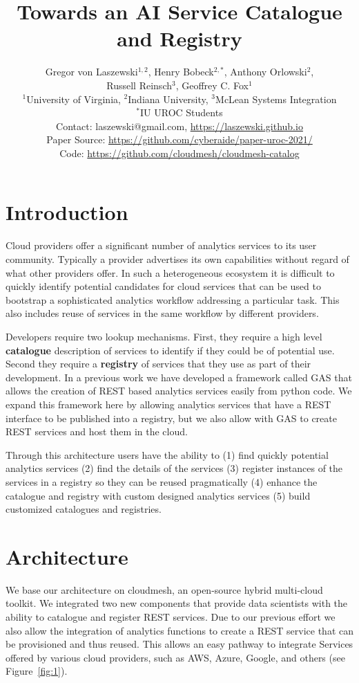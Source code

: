 \documentclass[12pt]{article}
\date{}
\title{Towards an AI Service Catalogue and Registry}
\author{Gregor von Laszewski$^{1,2}$,
Henry Bobeck$^{2,*}$,
Anthony Orlowski$^2$,\\
Russell Reinsch$^3$,
Geoffrey C. Fox$^1$\\
\footnotesize $^1$University of Virginia, 
$^2$Indiana University,
\footnotesize $^3$McLean Systems Integration\\
\footnotesize $^*$IU UROC Students \\
{
\footnotesize Contact: laszewski@gmail.com, \url{https://laszewski.github.io}\\
\footnotesize Paper Source: \url{https://github.com/cyberaide/paper-uroc-2021/}\\
\footnotesize Code: \url{https://github.com/cloudmesh/cloudmesh-catalog}}
}
\begin{document}
\maketitle

\section{Introduction}

Cloud providers offer a significant number of analytics services to its user community. Typically a provider advertises its own capabilities without regard of what other providers offer. In such a heterogeneous ecosystem it is difficult to quickly identify potential candidates for cloud services that can be used to bootstrap a sophisticated analytics workflow addressing a particular task. This also includes reuse of services in the same workflow by different providers. 

Developers require two lookup mechanisms. First, they require a high level {\bf catalogue} description of services to identify if they could be of potential use. Second they require a {\bf registry} of services that they use as part of their development. In a previous work we have developed a framework called GAS \cite{las-2021-gas} that allows the creation of REST based analytics services easily from python code. We expand this framework here by allowing analytics services that have a REST interface to be published into a registry, but we also allow with GAS to create REST services and host them in the cloud. 

Through this architecture users have the ability to 
(1) find quickly potential analytics services (2) find the details of the services (3) register instances of the services in a registry so they can be reused pragmatically  (4) enhance the catalogue and registry with custom designed analytics services (5) build customized catalogues and registries.

\section{Architecture}

We base our architecture on cloudmesh, an open-source hybrid multi-cloud toolkit. We integrated two new components that provide data scientists with the ability to catalogue and register REST services. Due to our previous effort we also allow the integration of analytics functions to create a REST service that can be provisioned and thus reused. This allows an easy pathway to integrate Services offered by various cloud providers, such as AWS, Azure, Google, and others (see Figure~\ref{fig:1}).  
\end{document}
